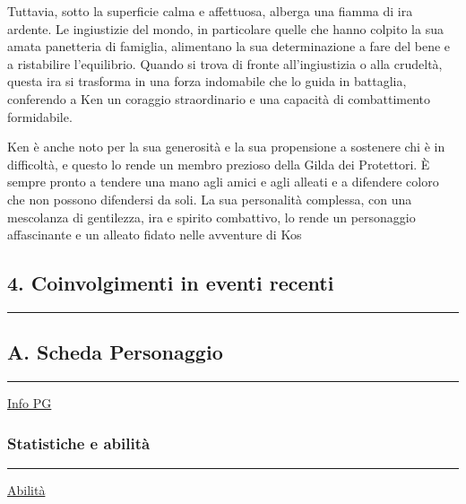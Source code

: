 Tuttavia, sotto la superficie calma e affettuosa, alberga una fiamma di
ira ardente. Le ingiustizie del mondo, in particolare quelle che hanno
colpito la sua amata panetteria di famiglia, alimentano la sua
determinazione a fare del bene e a ristabilire l'equilibrio. Quando si
trova di fronte all'ingiustizia o alla crudeltà, questa ira si trasforma
in una forza indomabile che lo guida in battaglia, conferendo a Ken un
coraggio straordinario e una capacità di combattimento formidabile.

Ken è anche noto per la sua generosità e la sua propensione a sostenere
chi è in difficoltà, e questo lo rende un membro prezioso della Gilda
dei Protettori. È sempre pronto a tendere una mano agli amici e agli
alleati e a difendere coloro che non possono difendersi da soli. La sua
personalità complessa, con una mescolanza di gentilezza, ira e spirito
combattivo, lo rende un personaggio affascinante e un alleato fidato
nelle avventure di Kos

\subsection{4. Coinvolgimenti in eventi
recenti}\label{coinvolgimenti-in-eventi-recenti}

\begin{center}\rule{0.5\linewidth}{0.5pt}\end{center}

\href{Untitled\%206d32341cd290432098378da8e9e19b98.csv}{}

\subsection{A. Scheda Personaggio}\label{a.-scheda-personaggio}

\begin{center}\rule{0.5\linewidth}{0.5pt}\end{center}

\href{Info\%20PG\%20ee5582184d634903a1f6d68b474f9c9e.csv}{Info PG}

\subsubsection{Statistiche e abilità}\label{statistiche-e-abilituxe0}

\begin{center}\rule{0.5\linewidth}{0.5pt}\end{center}

\href{Abilita\%CC\%80\%2097ecc9b336a54b24a61e1910cae67855.csv}{Abilità}

